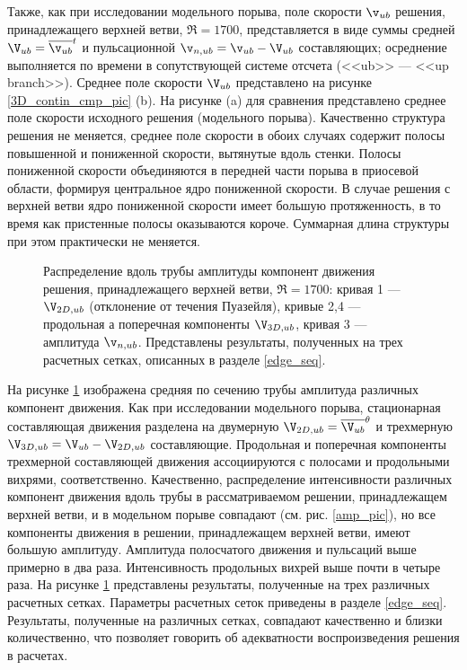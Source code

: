 Также, как при исследовании модельного порыва, поле скорости $\v_{ub}$ решения, принадлежащего верхней ветви, $\Re = 1700$, представляется в виде суммы средней $\V_{ub} = \overline{\v_{ub}}^t$ и пульсационной $\v_{n,ub} = \v_{ub} - \V_{ub}$ составляющих; осреднение выполняется по времени в сопутствующей системе отсчета (<<ub>> --- <<up branch>>). Среднее поле скорости $\V_{ub}$ представлено на рисунке \ref{3D_contin_cmp_pic} (b). На рисунке (a) для сравнения представлено среднее поле скорости исходного решения (модельного порыва). Качественно структура решения не меняется, среднее поле скорости в обоих случаях содержит полосы повышенной и пониженной скорости, вытянутые вдоль стенки. Полосы пониженной скорости объединяются в передней части порыва в приосевой области, формируя центральное ядро пониженной скорости. В случае решения с верхней ветви ядро пониженной скорости имеет большую протяженность, в то время как пристенные полосы оказываются короче. Суммарная длина структуры при этом практически не меняется. 


\begin{figure}
\caption{Распределение вдоль трубы амплитуды компонент движения решения, принадлежащего верхней ветви, $\Re = 1700$: кривая 1 --- $\V_{2D,ub}$ (отклонение от течения Пуазейля), кривые 2,4 --- продольная а поперечная компоненты $\V_{3D,ub}$, кривая 3 --- амплитуда $\v_{n,ub}$. Представлены результаты, полученных на трех расчетных сетках, описанных в разделе \ref{edge_seq}.}
\label{amp_ub_pic}
\end{figure}


На рисунке \ref{amp_ub_pic} изображена средняя по сечению трубы амплитуда различных компонент движения. Как при исследовании модельного порыва, стационарная составляющая движения разделена на двумерную $\V_{2D,ub} = \overline{\V_{ub}}^{\theta}$ и трехмерную $\V_{3D,ub} = \V_{ub} - \V_{2D,ub}$ составляющие. Продольная и поперечная компоненты трехмерной составляющей движения ассоциируются с полосами и продольными вихрями, соответственно. Качественно, распределение интенсивности различных компонент движения вдоль трубы в рассматриваемом решении, принадлежащем верхней ветви, и в модельном порыве совпадают (см. рис. \ref{amp_pic}), но все компоненты движения в решении, принадлежащем верхней ветви, имеют большую амплитуду. Амплитуда полосчатого движения и пульсаций выше примерно в два раза. Интенсивность продольных вихрей выше почти в четыре раза. На рисунке \ref{amp_ub_pic} представлены результаты, полученные на трех различных расчетных сетках. Параметры расчетных сеток приведены в разделе \ref{edge_seq}. Результаты, полученные на различных сетках, совпадают качественно и близки количественно, что позволяет говорить об адекватности воспроизведения решения в расчетах. 


